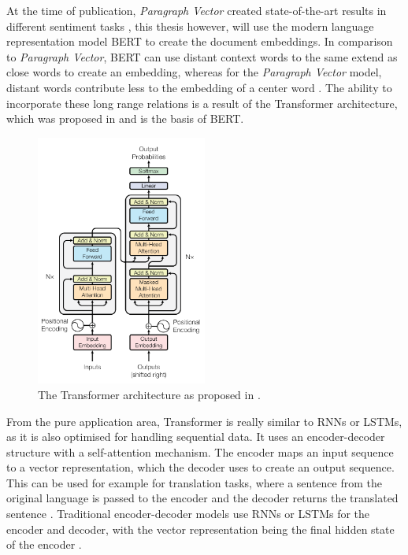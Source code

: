 At the time of publication, \textit{Paragraph Vector} created state-of-the-art results in different sentiment tasks \cite[pp. 4-7]{Mikolov2014}, this thesis however, will use the modern language representation model \ac{BERT} to create the document embeddings.
In comparison to \textit{Paragraph Vector}, \ac{BERT} can use distant context words to the same extend as close words to create an embedding, whereas for the \textit{Paragraph Vector} model, distant words contribute less to the embedding of a center word \cite[p. 4]{Mikolov2013}.
The ability to incorporate these long range relations is a result of the Transformer architecture, which was proposed in \cite{Vaswani2017} and is the basis of \ac{BERT}.
\begin{figure}[h]
    \centering
    \includegraphics[width=0.5\textwidth]{figures/transformer_architecture.png}
    \caption{The Transformer architecture as proposed in \cite[p. 3]{Vaswani2017}.}
    \label{figure:transformer_architecture}
\end{figure}
From the pure application area, Transformer is really similar to \acp{RNN} or \acp{LSTM}, as it is also optimised for handling sequential data.
It uses an encoder-decoder structure with a self-attention mechanism.
The encoder maps an input sequence to a vector representation, which the decoder uses to create an output sequence.
This can be used for example for translation tasks, where a sentence from the original language is passed to the encoder and the decoder returns the translated sentence \cite[p. 392]{Goodfellow2016}.
Traditional encoder-decoder models use \acp{RNN} or \acp{LSTM} for the encoder and decoder, with the vector representation being the final hidden state of the encoder \cite[p. 392]{Goodfellow2016}.
